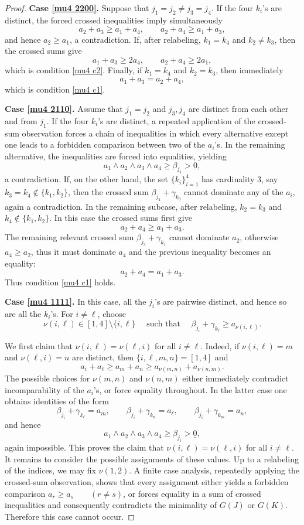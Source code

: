 \documentclass[10pt,a4paper]{amsart}
\begin{document}
\begin{proof}
\smallskip
\textbf{Case \ref{mu4 2200}.} Suppose that $j_1=j_2\neq j_3=j_4$. If the four $k_i$'s are distinct, the forced crossed inequalities imply simultaneously
\[
a_2+a_3\ge a_1+a_4,\qquad
a_2+a_4\ge a_1+a_3,
\]
and hence $a_2\ge a_1$, a contradiction. If, after relabeling, $k_1=k_4$ and $k_2\neq k_3$, then the crossed sums give
\[
a_1+a_3\ge 2a_4,\qquad a_2+a_4\ge 2a_1,
\]
which is condition \ref{mu4 c2}. Finally, if $k_1=k_4$ and $k_2=k_3$, then immediately
\[
a_1+a_3=a_2+a_4,
\]
which is condition \ref{mu4 c1}.

\smallskip
\textbf{Case \ref{mu4 2110}.} Assume that $j_1=j_2$ and $j_3,j_4$ are distinct from each other and from $j_1$. If the four $k_i$'s are distinct, a repeated application of the crossed-sum observation forces a chain of inequalities in which every alternative except one leads to a forbidden comparison between two of the $a_i$'s. In the remaining alternative, the inequalities are forced into equalities, yielding
\[
a_1\wedge a_2\wedge a_3\wedge a_4\ge \beta_{j_1}>\underline 0,
\]
a contradiction. If, on the other hand, the set $\{k_i\}_{i=1}^4$ has cardinality $3$, say $k_3=k_4\notin\{k_1,k_2\}$, then the crossed sum $\beta_{j_1}+\gamma_{k_3}$ cannot dominate any of the $a_i$, again a contradiction. In the remaining subcase, after relabeling, $k_2=k_3$ and $k_4\notin\{k_1,k_2\}$. In this case the crossed sums first give
\[
a_2+a_4\ge a_1+a_3.
\]
The remaining relevant crossed sum $\beta_{j_3} +\gamma_{k_1}$ cannot dominate $a_2$, otherwise $a_4\ge a_2$, thus it must dominate $a_4$ and the previous inequality becomes an equality:
\[
a_2+a_4=a_1+a_3.
\]
Thus condition \ref{mu4 c1} holds.

\textbf{Case \ref{mu4 1111}.} In this case, all the $j_i$'s are pairwise distinct, and hence so are all the $k_i$'s. For $i\neq \ell$, choose
\[
\nu(i,\ell)\in[1,4]\setminus\{i,\ell\}
\quad \text{ such that }\quad
\beta_{j_i}+\gamma_{k_\ell}\ge a_{\nu(i,\ell)}.
\]

We first claim that $\nu(i,\ell)=\nu(\ell,i)$
for all $i\neq \ell$. Indeed, if $\nu(i,\ell)=m$ and $\nu(\ell,i)=n$ are distinct, then $\{i,\ell,m,n\}=[1,4]$ and
\[
a_i+a_\ell
\ge a_m+a_n
\ge a_{\nu(m,n)}+a_{\nu(n,m)}.
\]
The possible choices for $\nu(m,n)$ and $\nu(n,m)$ either immediately contradict incomparability of the $a_i$'s, or force equality throughout. In the latter case one obtains identities of the form
\[
\beta_{j_i}+\gamma_{k_\ell}=a_m,\qquad
\beta_{j_i}+\gamma_{k_n}=a_\ell,\qquad
\beta_{j_i}+\gamma_{k_m}=a_n,
\]
and hence
\[
a_1\wedge a_2\wedge a_3\wedge a_4\ge \beta_{j_i}>\underline 0,
\]
again impossible. This proves the claim that $\nu(i,\ell)=\nu(\ell,i)$ for all $i\ne\ell$. It remains to consider the possible assignments of these values. Up to a relabeling of the indices, we may fix $\nu(1,2)$. A finite case analysis, repeatedly applying the crossed-sum observation, shows that every assignment either yields a forbidden comparison $a_r\ge a_s\qquad (r\ne s)$, or forces equality in a sum of crossed inequalities and consequently contradicts the minimality of $G(J)$ or $G(K)$. Therefore this case cannot occur. 


\end{proof}
\end{document}
